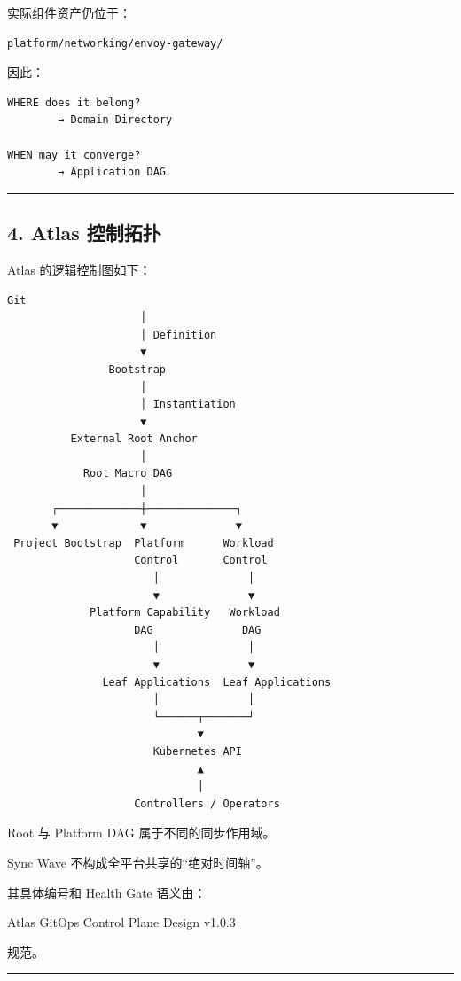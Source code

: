 \documentclass[11pt,a4paper]{article}
\begin{document}
实际组件资产仍位于：

\begin{lstlisting}[language=text]
platform/networking/envoy-gateway/
\end{lstlisting}
因此：

\begin{lstlisting}[language=text]
WHERE does it belong?
        → Domain Directory

WHEN may it converge?
        → Application DAG
\end{lstlisting}
\vspace{0.5em}\hrule\vspace{0.5em}
\subsection{4. Atlas 控制拓扑}
Atlas 的逻辑控制图如下：

\begin{lstlisting}[language=text]
                    Git
                     │
                     │ Definition
                     ▼
                Bootstrap
                     │
                     │ Instantiation
                     ▼
          External Root Anchor
                     │
            Root Macro DAG
                     │
       ┌─────────────┼──────────────┐
       ▼             ▼              ▼
 Project Bootstrap  Platform      Workload
                    Control       Control
                       │              │
                       ▼              ▼
             Platform Capability   Workload
                    DAG              DAG
                       │              │
                       ▼              ▼
               Leaf Applications  Leaf Applications
                       │              │
                       └──────┬───────┘
                              ▼
                       Kubernetes API
                              ▲
                              │
                    Controllers / Operators
\end{lstlisting}
Root 与 Platform DAG 属于不同的同步作用域。

Sync Wave 不构成全平台共享的“绝对时间轴”。

其具体编号和 Health Gate 语义由：

\begin{gfmBlockquote}
Atlas GitOps Control Plane Design v1.0.3
\end{gfmBlockquote}
规范。

\vspace{0.5em}\hrule\vspace{0.5em}
\end{document}
